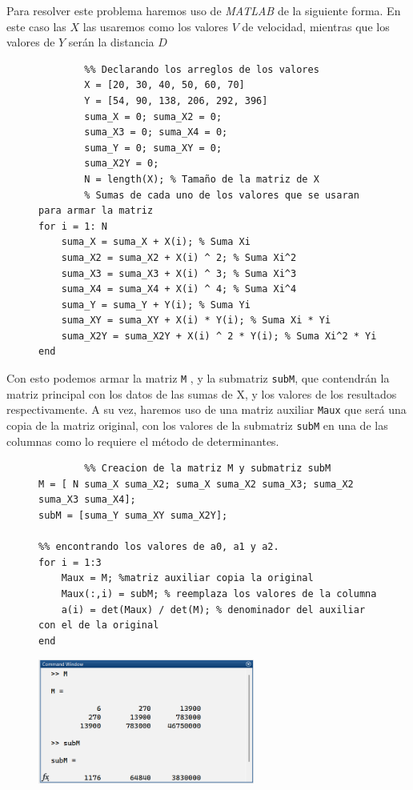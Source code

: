 \documentclass[11pt,letterpaper]{article}
\begin{document}
Para resolver este problema haremos uso de \emph{MATLAB} de la siguiente forma. En este caso las $X$ las usaremos como los valores $V$ de velocidad, mientras que los valores de $Y$ serán la distancia $D$
\begin{figure}[H]
\begin{tcolorbox}[title=Problema 4: Implementación en MATLAB]
	\begin{verbatim}
		%% Declarando los arreglos de los valores
		X = [20, 30, 40, 50, 60, 70]
		Y = [54, 90, 138, 206, 292, 396]
		suma_X = 0; suma_X2 = 0;
		suma_X3 = 0; suma_X4 = 0;
		suma_Y = 0; suma_XY = 0;
		suma_X2Y = 0;
		N = length(X); % Tamaño de la matriz de X
		% Sumas de cada uno de los valores que se usaran para armar la matriz 
for i = 1: N
    suma_X = suma_X + X(i); % Suma Xi
    suma_X2 = suma_X2 + X(i) ^ 2; % Suma Xi^2
    suma_X3 = suma_X3 + X(i) ^ 3; % Suma Xi^3
    suma_X4 = suma_X4 + X(i) ^ 4; % Suma Xi^4
    suma_Y = suma_Y + Y(i); % Suma Yi
    suma_XY = suma_XY + X(i) * Y(i); % Suma Xi * Yi
    suma_X2Y = suma_X2Y + X(i) ^ 2 * Y(i); % Suma Xi^2 * Yi
end
\end{verbatim}
\end{tcolorbox}
\end{figure}
Con esto podemos armar la matriz  \texttt{M} , y la submatriz \texttt{subM}, que contendrán la matriz principal con los datos de las sumas de X, y los valores de los resultados respectivamente. A su vez, haremos uso de una matriz auxiliar \texttt{Maux} que será una copia de la matriz original, con los valores de la submatriz \texttt{subM} en una de las columnas como lo requiere el método de determinantes.
\begin{figure}[H]
\begin{tcolorbox}[ title=Problema 4: Implementación en MATLAB]
		\begin{verbatim}
		%% Creacion de la matriz M y submatriz subM
M = [ N suma_X suma_X2; suma_X suma_X2 suma_X3; suma_X2 suma_X3 suma_X4];
subM = [suma_Y suma_XY suma_X2Y];

%% encontrando los valores de a0, a1 y a2.
for i = 1:3
    Maux = M; %matriz auxiliar copia la original
    Maux(:,i) = subM; % reemplaza los valores de la columna
    a(i) = det(Maux) / det(M); % denominador del auxiliar con el de la original
end
		\end{verbatim}
		\end{tcolorbox}
		\centering
		\includegraphics[width=2.8in]{mtz4.png}

\end{figure}
\end{document}
